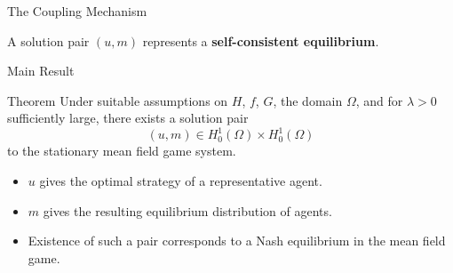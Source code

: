 \documentclass[aspectratio=169]{beamer}
\begin{document}
\begin{frame}{The Coupling Mechanism}
\centering
{}

\vspace{0.5cm}

A solution pair \((u,m)\) represents a \textbf{self-consistent equilibrium}.
\end{frame}

\begin{frame}{Main Result}
\begin{block}{Theorem}
Under suitable assumptions on \(H\), \(f\), \(G\), the domain \(\Omega\), and for \(\lambda > 0\) sufficiently large, there exists a solution pair
\[
(u,m) \in H_0^1(\Omega)\times H_0^1(\Omega)
\]
to the stationary mean field game system.
\end{block}

\vspace{0.4cm}

\begin{itemize}
    \item \(u\) gives the optimal strategy of a representative agent.
    \item \(m\) gives the resulting equilibrium distribution of agents.
    \item Existence of such a pair corresponds to a Nash equilibrium in the mean field game.
\end{itemize}
\end{frame}
\end{document}

